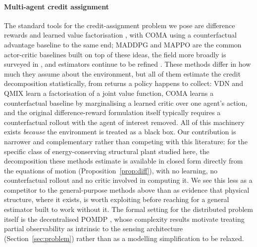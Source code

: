 \documentclass[preprint,11pt,authoryear]{elsarticle}
\begin{document}
\paragraph{Multi-agent credit assignment}
The standard tools for the credit-assignment problem we pose are difference
rewards \citep{wolpert2002difference} and learned value factorisation
\citep{sunehag2018vdn,rashid2018qmix}, with COMA \citep{foerster2018coma} using a
counterfactual advantage baseline to the same end; MADDPG
\citep{lowe2017maddpg} and MAPPO \citep{yu2022mappo} are the common actor-critic
baselines built on top of these ideas, the field more broadly is surveyed in
\citep{albrecht2023survey,scalingmarl2025}, and estimators continue to be
refined \citep{multilevelcredit2025}. These methods differ in how much they
assume about the environment, but all of them estimate the credit
decomposition statistically, from returns a policy happens to collect: VDN and
QMIX \citep{sunehag2018vdn,rashid2018qmix} learn a factorisation of a joint
value function, COMA \citep{foerster2018coma} learns a counterfactual baseline
by marginalising a learned critic over one agent's action, and the original
difference-reward formulation \citep{wolpert2002difference} itself typically
requires a counterfactual rollout with the agent of interest removed. All of
this machinery exists \emph{because} the environment is treated as a black box.
Our contribution is narrower and complementary rather than competing with this
literature: for the specific class of energy-conserving structural plant
studied here, the decomposition these methods estimate is available in closed
form directly from the equations of motion (Proposition~\ref{prop:diff}), with
no learning, no counterfactual rollout and no critic involved in computing it.
We see this less as a competitor to the general-purpose methods above than as
evidence that physical structure, where it exists, is worth exploiting before
reaching for a general estimator built to work without it. The formal setting
for the distributed problem itself is the decentralised POMDP
\citep{bernstein2002complexity,oliehoek2016concise}, whose complexity results
motivate treating partial observability as intrinsic to the sensing
architecture (Section~\ref{sec:problem}) rather than as a modelling
simplification to be relaxed.
\end{document}
